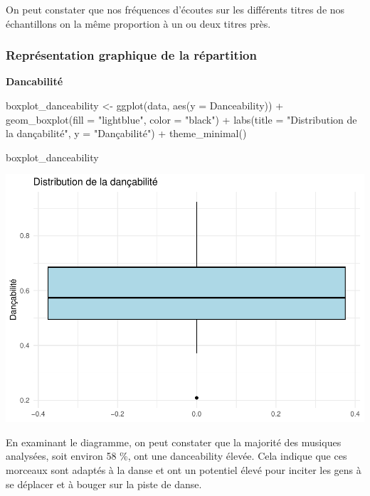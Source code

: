 \documentclass[
]{article}
\newenvironment{Shaded}{\begin{snugshade}}{\end{snugshade}}
\newcommand{\AttributeTok}[1]{\textcolor[rgb]{0.77,0.63,0.00}{#1}}
\newcommand{\FunctionTok}[1]{\textcolor[rgb]{0.00,0.00,0.00}{#1}}
\newcommand{\NormalTok}[1]{#1}
\newcommand{\OtherTok}[1]{\textcolor[rgb]{0.56,0.35,0.01}{#1}}
\newcommand{\SpecialCharTok}[1]{\textcolor[rgb]{0.00,0.00,0.00}{#1}}
\newcommand{\StringTok}[1]{\textcolor[rgb]{0.31,0.60,0.02}{#1}}
\begin{document}
On peut constater que nos fréquences d'écoutes sur les différents titres
de nos échantillons on la même proportion à un ou deux titres près.

\hypertarget{repruxe9sentation-graphique-de-la-ruxe9partition}{%
\subsubsection{Représentation graphique de la
répartition}\label{repruxe9sentation-graphique-de-la-ruxe9partition}}

\textbf{Dancabilité}

\begin{Shaded}
\begin{Highlighting}[]
\NormalTok{boxplot\_danceability }\OtherTok{\textless{}{-}} \FunctionTok{ggplot}\NormalTok{(data, }\FunctionTok{aes}\NormalTok{(}\AttributeTok{y =}\NormalTok{ Danceability)) }\SpecialCharTok{+}
  \FunctionTok{geom\_boxplot}\NormalTok{(}\AttributeTok{fill =} \StringTok{"lightblue"}\NormalTok{, }\AttributeTok{color =} \StringTok{"black"}\NormalTok{) }\SpecialCharTok{+}
  \FunctionTok{labs}\NormalTok{(}\AttributeTok{title =} \StringTok{"Distribution de la dançabilité"}\NormalTok{, }\AttributeTok{y =} \StringTok{"Dançabilité"}\NormalTok{) }\SpecialCharTok{+}
  \FunctionTok{theme\_minimal}\NormalTok{()}

\NormalTok{boxplot\_danceability}
\end{Highlighting}
\end{Shaded}

\includegraphics{spotify_analysis_files/figure-latex/unnamed-chunk-5-1.pdf}

En examinant le diagramme, on peut constater que la majorité des
musiques analysées, soit environ 58 \%, ont une danceability élevée.
Cela indique que ces morceaux sont adaptés à la danse et ont un
potentiel élevé pour inciter les gens à se déplacer et à bouger sur la
piste de danse.
\end{document}
